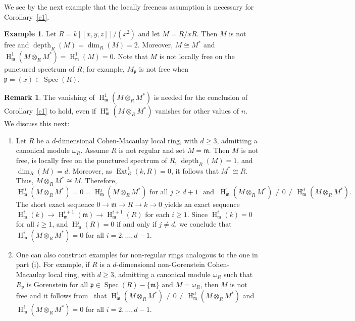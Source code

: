 \documentclass[11pt]{amsart}
\theoremstyle{definition}
\theoremstyle{definition}
\newtheorem{eg}[thm]{Example}
\newtheorem{rmk}[thm]{Remark}
\numberwithin{equation}{section}
\newcommand{\fm}{\mathfrak{m}}
\newcommand{\fp}{\mathfrak{p}}
\DeclareMathOperator{\depth}{depth}
\DeclareMathOperator{\Ext}{Ext}
\DeclareMathOperator{\hh}{H}
\DeclareMathOperator{\Spec}{Spec}
\begin{document}
We see by the next example that the locally freeness assumption is necessary for Corollary~\ref{c1}.

\begin{eg}\label{directsum} Let $R=k[\![x,y,z]\!]/(x^2)$ and let $M=R/xR$. Then $M$ is not free and $\depth_R(M)=\dim_R(M)=2$. Moreover, $M \cong M^\ast$ and $\hh^{ 1}_{\fm} (M\otimes_RM^\ast)=\hh^{ 1}_{\fm} (M)=0$. Note that $M$ is not locally free on the punctured spectrum of $R$; for example, $M_{\fp}$ is not free when $\fp=(x)\in \Spec(R)$.
\end{eg}

\begin{rmk}\label{directsum2} The vanishing of $\hh^1_{\fm}(M\otimes_RM^*)$ is needed for the conclusion of Corollary~\ref{c1} to hold, even if $\hh^n_{\fm}(M\otimes_RM^*)$ vanishes for other values of $n$. We discuss this next:
\begin{enumerate}[\rm(i)]
\item Let $R$ be a $d$-dimensional Cohen-Macaulay local ring, with $d\geq 3$, admitting a canonical module $\omega_R$. Assume $R$ is not regular and set $M=\fm$. Then $M$ is not free, is locally free on the punctured spectrum of $R$, $\depth_R(M)=1$, and $\dim_R(M)=d$. Moreover, as $\Ext^1_R(k,R)=0$, it follows that $M^{\ast} \cong R$. Thus, $M\otimes_RM^{\ast} \cong M$. Therefore, $$\hh^{0}_{\fm}(M\otimes _R M^\ast)=0=\hh^{j}_{\fm}(M\otimes _R M^\ast) \text{ for all }j\geq d+1 \; \text{ and }\; \hh^{1}_{\fm}(M\otimes _R M^\ast)\neq 0\neq \hh^{d}_{\fm}(M\otimes _R M^\ast).$$
The short exact sequence $0 \to \fm \to R \to k \to 0$ yields an exact sequence $\hh^i_{\fm}(k) \to \hh^{i+1}_{\fm}(\fm) \to \hh^{i+1}_{\fm}(R)$ for each $i\geq 1$. Since $\hh^i_{\fm}(k)=0$ for all $i\geq 1$, and $\hh^{j}_{\fm}(R)=0$ if and only if $j\neq d$, we conclude that $\hh^{i}_{\fm}(M\otimes _R M^\ast)=0$ for all $i=2, \ldots, d-1$. 
\smallskip

\item One can also construct examples for non-regular rings analogous to the one in part (i). For example, if $R$ is a $d$-dimensional non-Gorenstein Cohen-Macaulay local ring, with $d\geq 3$, admitting a canonical module $\omega_R$ such that $R_{\fp}$ is Gorenstein for all $\fp \in \Spec(R)-\{\fm\}$ and $M=\omega_R$, then $M$ is not free and it follows from~\cite[5.8]{MA} that $\hh^{1}_{\fm}(M\otimes _R M^\ast)\neq 0 \neq \hh^{d}_{\fm}(M\otimes _R M^\ast)$ and $\hh^{i}_{\fm}(M\otimes _R M^\ast)=0$ for all $i=2, \ldots, d-1$.
\end{enumerate}
\end{rmk}
\end{document}

